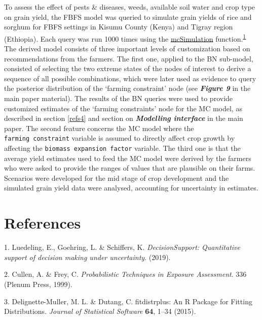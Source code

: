\documentclass[]{elsarticle} %
\begin{document}
To assess the effect of pests \& diseases, weeds, available soil water and crop type on grain yield, the FBFS model was queried to simulate grain yields of rice and sorghum for FBFS settings in Kisumu County (Kenya) and Tigray region (Ethiopia). Each query was run 1000 times using the \href{https://www.rdocumentation.org/packages/decisionSupport/versions/1.103.8/topics/mcSimulation}{mcSimulation} function.\textsuperscript{\protect\hyperlink{ref-Luedeling_Goehring_et_al_2019}{1}} The derived model consists of three important levels of customization based on recommendations from the farmers. The first one, applied to the BN sub-model, consisted of selecting the two extreme states of the nodes of interest to derive a sequence of all possible combinations, which were later used as evidence to query the posterior distribution of the `farming constraint' node (see \textbf{\emph{Figure 9}} in the main paper material). The results of the BN queries were used to provide customized estimates of the `farming constraints' node for the MC model, as described in section \ref{refs4} and section on \textbf{\emph{Modelling interface}} in the main paper. The second feature concerns the MC model where the \texttt{farming\ constraint} variable is assumed to directly affect crop growth by affecting the \texttt{biomass\ expansion\ factor} variable. The third one is that the average yield estimates used to feed the MC model were derived by the farmers who were asked to provide the ranges of values that are plausible on their farms. Scenarios were developed for the mid stage of crop development and the simulated grain yield data were analysed, accounting for uncertainty in estimates.

\hypertarget{references}{%
\section*{References}\label{references}}

\hypertarget{refs}{}
\leavevmode\hypertarget{ref-Luedeling_Goehring_et_al_2019}{}%
1. Luedeling, E., Goehring, L. \& Schiffers, K. \emph{DecisionSupport: Quantitative support of decision making under uncertainty}. (2019).

\leavevmode\hypertarget{ref-Cullen_and_Frey_1999}{}%
2. Cullen, A. \& Frey, C. \emph{Probabilistic Techniques in Exposure Assessment}. 336 (Plenum Press, 1999).

\leavevmode\hypertarget{ref-Delignette-Muller_and_Dutang_2015}{}%
3. Delignette-Muller, M. L. \& Dutang, C. fitdistrplus: An R Package for Fitting Distributions. \emph{Journal of Statistical Software} \textbf{64}, 1--34 (2015).
\end{document}
